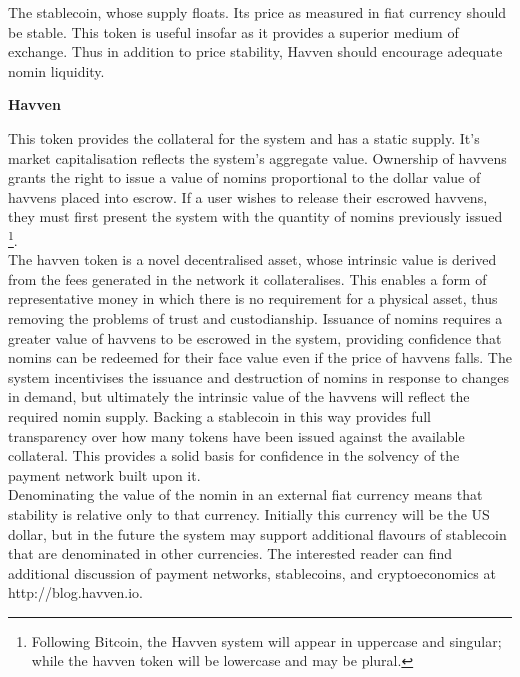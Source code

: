 \vspace{1mm}

\noindent The stablecoin, whose supply floats. Its price as measured in fiat currency should be stable. This token is useful insofar as it provides a superior medium of exchange. Thus in addition to price stability, Havven should encourage adequate nomin liquidity.

\vspace{2mm}

\noindent \textbf{Havven}

\vspace{1mm}

\noindent This token provides the collateral for the system and has a static supply. It’s market capitalisation reflects the system’s aggregate value. Ownership of havvens grants the right to issue a value of nomins proportional to the dollar value of havvens placed into escrow. If a user wishes to release their escrowed havvens, they must first present the system with the quantity of nomins previously issued \footnote{Following Bitcoin, the Havven system will appear in uppercase and singular; while the havven token will be lowercase and may be plural.}. \\

\noindent The havven token is a novel decentralised asset, whose intrinsic value is derived from the fees generated in the network it collateralises. This enables a form of representative money in which there is no requirement for a physical asset, thus removing the problems of trust and custodianship. Issuance of nomins requires a greater value of havvens to be escrowed in the system, providing confidence that nomins can be redeemed for their face value even if the price of havvens falls. The system incentivises the issuance and destruction of nomins in response to changes in demand, but ultimately the intrinsic value of the havvens will reflect the required nomin supply. Backing a stablecoin in this way provides full transparency over how many tokens have been issued against the available collateral. This provides a solid basis for confidence in the solvency of the payment network built upon it.\\

\noindent Denominating the value of the nomin in an external fiat currency means that stability is relative only to that currency. Initially this currency will be the US dollar, but in the future the system may support additional flavours of stablecoin that are denominated in other currencies. The interested reader can find additional discussion of payment networks, stablecoins, and cryptoeconomics at http://blog.havven.io.

\pagebreak
